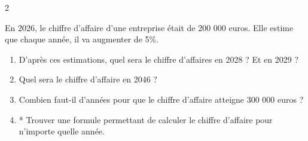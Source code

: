 \documentclass[10pt,a4paper]{article}
\begin{document}
\begin{multicols}{2}
\begin{exo}
    
    En 2026, le chiffre d'affaire d'une entreprise était de 200 000 euros. Elle estime que chaque année, il va augmenter de 5\%.
    \begin{enumerate}
        \item D'après ces estimations, quel sera le chiffre d'affaires en 2028 ? Et en 2029 ?
        \item Quel sera le chiffre d'affaire en 2046 ?
        \item Combien faut-il d'années pour que le chiffre d'affaire atteigne 300 000 euros ?
        \item * Trouver une formule permettant de calculer le chiffre d'affaire pour n'importe quelle année.
    \end{enumerate}
\end{exo}


\end{multicols}
\end{document}
